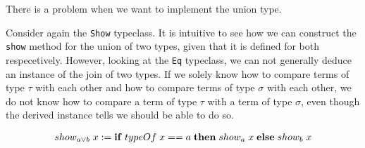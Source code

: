 




There is a problem when we want to implement the union type.

Consider again the \texttt{Show} typeclass. It is intuitive to see how we can construct the \texttt{show} method for the union of two types, given that it is defined for both respecetively.
However, looking at the \texttt{Eq} typeclass, we can not generally deduce an instance of the join of two types.
If we solely know how to compare terms of type $\tau$ with each other and how to compare terms of type $\sigma$ with each other,
we do not know how to compare a term of type $\tau$ with a term of type $\sigma$, even though the derived instance tells we should be able to do so.

\begin{gather}
  \nonumber show_{a\vee b} \; x := {\bf if} \; typeOf \; x == a \; {\bf then} \; show_a \; x \; {\bf else} \; show_b \; x
\end{gather}

